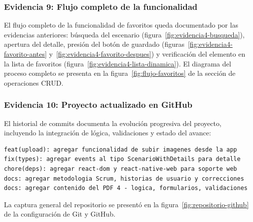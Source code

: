 \subsubsection*{Evidencia 9: Flujo completo de la funcionalidad}

El flujo completo de la funcionalidad de favoritos queda documentado por
las evidencias anteriores: b\'usqueda del escenario
(figura~\ref{fig:evidencia4-busqueda}), apertura del detalle, presi\'on del
bot\'on de guardado (figuras~\ref{fig:evidencia4-favorito-antes}
y~\ref{fig:evidencia4-favorito-despues}) y verificaci\'on del elemento en la
lista de favoritos (figura~\ref{fig:evidencia4-lista-dinamica}). El
diagrama del proceso completo se presenta en la
figura~\ref{fig:flujo-favoritos} de la secci\'on de operaciones CRUD.

\subsubsection*{Evidencia 10: Proyecto actualizado en GitHub}

El historial de commits documenta la evoluci\'on progresiva del proyecto,
incluyendo la integraci\'on de l\'ogica, validaciones y estado del avance:

\begin{lstlisting}[style=terminal]
feat(upload): agregar funcionalidad de subir imagenes desde la app
fix(types): agregar events al tipo ScenarioWithDetails para detalle
chore(deps): agregar react-dom y react-native-web para soporte web
docs: agregar metodologia Scrum, historias de usuario y correcciones
docs: agregar contenido del PDF 4 - logica, formularios, validaciones
\end{lstlisting}

La captura general del repositorio se present\'o en la
figura~\ref{fig:repositorio-github} de la configuraci\'on de Git y GitHub.
